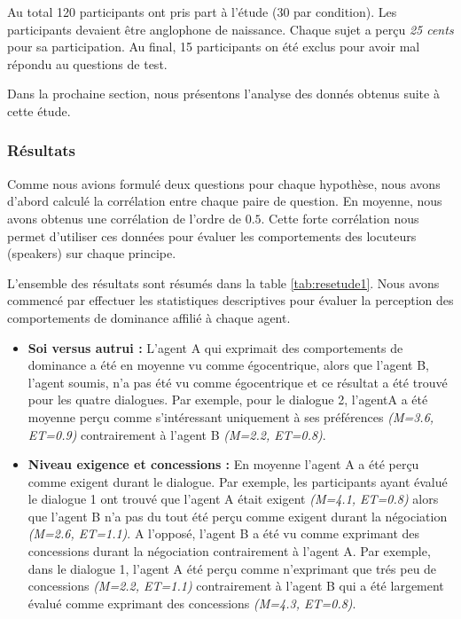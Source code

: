 {					Au total 120 participants ont pris part à l'étude (30 par condition). Les participants devaient être anglophone de naissance. Chaque sujet a perçu \textit{25 cents} pour sa participation. Au final, 15 participants on été exclus pour avoir mal répondu au questions de test. 
					
					Dans la prochaine section, nous présentons l'analyse des donnés obtenus suite à cette étude.
					
					
			\subsubsection{Résultats}
				Comme nous avions formulé deux questions pour chaque hypothèse, nous avons d'abord calculé la corrélation entre chaque paire de question. En moyenne, nous avons obtenus une corrélation de l'ordre de $0.5$. Cette forte corrélation nous permet d'utiliser ces données pour évaluer les comportements des locuteurs (speakers) sur chaque principe. 
				
				L'ensemble des résultats sont résumés dans la table \ref{tab:resetude1}. Nous avons commencé par effectuer les statistiques descriptives pour évaluer la perception des comportements de dominance affilié à chaque agent. 
					\begin{itemize}
							\item \textbf{Soi versus autrui :} L'agent A qui exprimait des comportements de dominance a été en moyenne vu comme égocentrique, alors que l'agent B, l'agent soumis, n'a pas été vu comme égocentrique et ce résultat a été trouvé pour les quatre dialogues.
							Par exemple, pour le dialogue 2, l'agentA a été moyenne perçu comme s'intéressant uniquement à ses préférences \textit{(M=3.6, ET=0.9)} contrairement à l'agent B \textit{(M=2.2, ET=0.8)}.
							
							\item \textbf{Niveau exigence et concessions :} En moyenne l'agent A a été perçu comme exigent durant le dialogue. Par exemple, les participants ayant évalué le dialogue 1 ont trouvé que l'agent A était exigent \textit{(M=4.1, ET=0.8)} alors que l'agent B n'a pas du tout été perçu comme exigent durant la négociation \textit{(M=2.6, ET=1.1)}. A l'opposé, l'agent B a été vu comme exprimant des concessions durant la négociation contrairement à l'agent A. Par exemple, dans le dialogue 1, l'agent A été perçu comme n'exprimant que trés peu de concessions \textit{(M=2.2, ET=1.1)} contrairement à l'agent B qui a été largement évalué comme exprimant des concessions \textit{(M=4.3, ET=0.8)}.
							

\end{itemize}}
